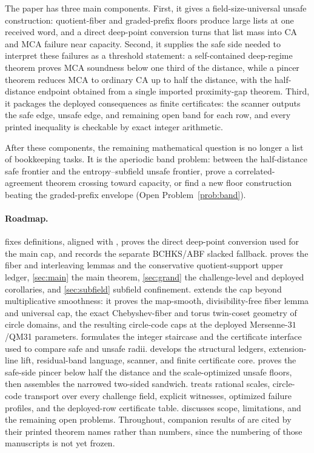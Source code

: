 \documentclass[11pt]{article}
\theoremstyle{definition}
\theoremstyle{remark}
\begin{document}
The paper has three main components.  First, it gives a field-size-universal unsafe construction: quotient-fiber and graded-prefix floors produce large lists at one received word, and a direct deep-point conversion turns that list mass into CA and MCA failure near capacity.  Second, it supplies the safe side needed to interpret these failures as a threshold statement: a self-contained deep-regime theorem proves MCA soundness below one third of the distance, while a pincer theorem reduces MCA to ordinary CA up to half the distance, with the half-distance endpoint obtained from a single imported proximity-gap theorem.  Third, it packages the deployed consequences as finite certificates: the scanner outputs the safe edge, unsafe edge, and remaining open band for each row, and every printed inequality is checkable by exact integer arithmetic.

After these components, the remaining mathematical question is no longer a list of bookkeeping tasks.  It is the aperiodic band problem: between the half-distance safe frontier and the entropy--subfield unsafe frontier, prove a correlated-agreement theorem crossing toward capacity, or find a new floor construction beating the graded-prefix envelope (Open Problem~\ref{prob:band}).

\paragraph{Roadmap.}  fixes definitions, aligned with \cite[Defs.~4.1, 4.3]{ABF26}, proves the direct deep-point conversion used for the main cap, and records the separate BCHKS/ABF slacked fallback.  proves the fiber and interleaving lemmas and the conservative quotient-support upper ledger, \cref{sec:main} the main theorem, \cref{sec:grand} the challenge-level and deployed corollaries, and \cref{sec:subfield} subfield confinement.  extends the cap beyond multiplicative smoothness: it proves the map-smooth, divisibility-free fiber lemma and universal cap, the exact Chebyshev-fiber and torus twin-coset geometry of circle domains, and the resulting circle-code caps at the deployed Mersenne-$31$/QM31 parameters.  formulates the integer staircase and the certificate interface used to compare safe and unsafe radii.   develops the structural ledgers, extension-line lift, residual-band language, scanner, and finite certificate core.   proves the safe-side pincer below half the distance and the scale-optimized unsafe floors, then assembles the narrowed two-sided sandwich.   treats rational scales, circle-code transport over every challenge field, explicit witnesses, optimized failure profiles, and the deployed-row certificate table.   discusses scope, limitations, and the remaining open problems.  Throughout, companion results of \cite{Cho26a,Cho26b} are cited by their printed theorem names rather than numbers, since the numbering of those manuscripts is not yet frozen.
\end{document}
